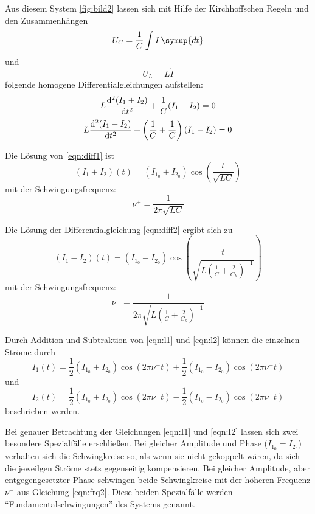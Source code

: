 Aus diesem System \ref{fig:bild2} lassen sich mit Hilfe der Kirchhoffschen Regeln und den Zusammenhängen
\begin{equation*}
    U_C=\frac{1}{C}\int I \, \symup{dt}
\end{equation*}
und
\begin{equation*}
    U_L=L\dot{I}
\end{equation*}
folgende homogene Differentialgleichungen aufstellen:
\begin{equation}
\label{eqn:diff1}
    L\dv[2]{(I_1+I_2)}{t}+\frac{1}{C}(I_1+I_2)=0 
\end{equation}
\begin{equation}
\label{eqn:diff2}
    L\dv[2]{(I_1-I_2)}{t}+\left(\frac{1}{C}+\frac{1}{C}\right)(I_1-I_2)=0 
\end{equation}

Die Lösung von \eqref{eqn:diff1} ist 
\begin{equation}
\label{eqn:l1}
    (I_1+I_2)(t)=(I_{1_0}+I_{2_0})\cos(\frac{t}{\sqrt{LC}})
\end{equation}
mit der Schwingungsfrequenz:
\begin{equation}
\label{eqn:frq1}
    \nu^+=\frac{1}{2\pi\sqrt{LC}}
\end{equation}

Die Lösung der Differentialgleichung \eqref{eqn:diff2} ergibt sich zu
\begin{equation}
\label{eqn:l2}
    (I_1-I_2)(t)=(I_{1_0}-I_{2_0})\cos(\frac{t}{\sqrt{L\left(\frac{1}{C}+\frac{2}{C_k}\right)^{-1}}})
\end{equation}
mit der Schwingungsfrequenz:
\begin{equation}
\label{eqn:frq2}
    \nu^-=\frac{1}{2\pi\sqrt{L\left(\frac{1}{C}+\frac{2}{C_k}\right)^{-1}}}
\end{equation}

Durch Addition und Subtraktion von \eqref{eqn:l1} und \eqref{eqn:l2} können die einzelnen Ströme durch
\begin{equation}
\label{eqn:I1}
    I_1(t)=\frac{1}{2}(I_{1_0}+I_{2_0})\cos(2\pi\nu^+t)+\frac{1}{2}(I_{1_0}-I_{2_0})\cos(2\pi\nu^-t)
\end{equation}
und 
\begin{equation} 
\label{eqn:I2}
    I_2(t)=\frac{1}{2}(I_{1_0}+I_{2_0})\cos(2\pi\nu^+t)-\frac{1}{2}(I_{1_0}-I_{2_0})\cos(2\pi\nu^-t)
\end{equation}
beschrieben werden.

Bei genauer Betrachtung der Gleichungen \eqref{eqn:I1} und \eqref{eqn:I2} lassen sich zwei besondere Spezialfälle erschließen.
Bei gleicher Amplitude und Phase ($I_{1_0}=I_{2_0}$) verhalten sich die Schwingkreise so, als wenn sie nicht gekoppelt wären, da sich die 
jeweilgen Ströme stets gegenseitig kompensieren. Bei gleicher Amplitude, aber entgegengesetzter Phase schwingen beide Schwingkreise mit 
der höheren Frequenz $\nu^-$ aus Gleichung \eqref{eqn:frq2}. Diese beiden Spezialfälle werden \enquote{Fundamentalschwingungen} des Systems genannt.

